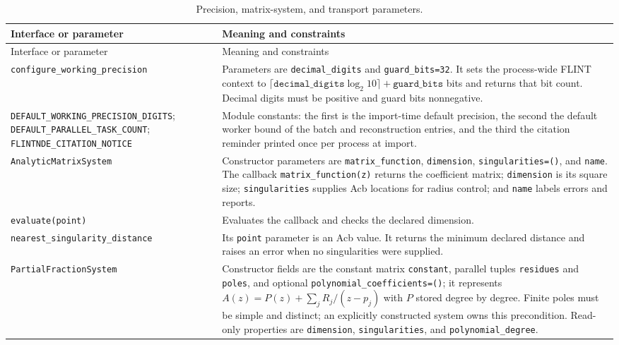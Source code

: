\documentclass[11pt]{article}
\begin{document}
\small
\begin{longtable}{L{0.36\textwidth}L{0.58\textwidth}}
\caption{Precision, matrix-system, and transport parameters.}\label{tab:ordinary-api}\\
\toprule
Interface or parameter & Meaning and constraints \\
\midrule
\endfirsthead
\toprule
Interface or parameter & Meaning and constraints \\
\midrule
\endhead
\texttt{configure\_working\_precision} & Parameters are \texttt{decimal\_digits} and
\texttt{guard\_bits=32}.  It sets the process-wide FLINT context to
$\lceil\texttt{decimal\_digits}\log_2 10\rceil+\texttt{guard\_bits}$ bits and returns that bit
count.  Decimal digits must be positive and guard bits nonnegative. \\
\texttt{DEFAULT\_WORKING\_}\newline\texttt{PRECISION\_DIGITS};
\texttt{DEFAULT\_PARALLEL\_}\newline\texttt{TASK\_COUNT};
\texttt{FLINTNDE\_CITATION\_}\newline\texttt{NOTICE} & Module constants: the first is the
import-time default precision, the second the default worker bound of the batch and
reconstruction entries, and the third the citation reminder printed once per process at
import. \\
\texttt{AnalyticMatrixSystem} & Constructor parameters are \texttt{matrix\_function},
\texttt{dimension}, \texttt{singularities=()}, and \texttt{name}.  The callback
\texttt{matrix\_function(z)} returns the coefficient matrix; \texttt{dimension} is its
square size; \texttt{singularities} supplies Acb locations for radius control; and
\texttt{name} labels errors and reports. \\
\texttt{evaluate(point)} & Evaluates the callback and checks the declared dimension. \\
\texttt{nearest\_singularity\_distance} & Its \texttt{point} parameter is an Acb value.  It
returns the minimum declared distance and raises an error when no singularities were
supplied. \\
\texttt{PartialFractionSystem} & Constructor fields are the constant matrix
\texttt{constant}, parallel tuples \texttt{residues} and \texttt{poles}, and optional
\texttt{polynomial\_coefficients=()}; it represents
$A(z)=P(z)+\sum_j R_j/(z-p_j)$ with $P$ stored degree by degree.  Finite poles must be
simple and distinct; an explicitly constructed system owns this precondition.  Read-only
properties are \texttt{dimension}, \texttt{singularities}, and \texttt{polynomial\_degree}. \\

\end{longtable}
\end{document}
